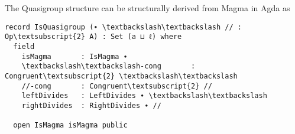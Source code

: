 The Quasigroup structure can be structurally derived from Magma in Agda as 

\begin{Verbatim}[commandchars=\\\{\},samepage=true]
record IsQuasigroup (∙ \textbackslash\textbackslash // : Op\textsubscript{2} A) : Set (a ⊔ ℓ) where
  field
    isMagma       : IsMagma ∙
    \textbackslash\textbackslash-cong       : Congruent\textsubscript{2} \textbackslash\textbackslash
    //-cong       : Congruent\textsubscript{2} //
    leftDivides   : LeftDivides ∙ \textbackslash\textbackslash
    rightDivides  : RightDivides ∙ //

  open IsMagma isMagma public
\end{Verbatim}
\begin{comment}
  \textbackslash\textbackslash-cong\textsuperscript{l} : LeftCongruent \textbackslash\textbackslash
  \textbackslash\textbackslash-cong\textsuperscript{l} y≈z = \textbackslash\textbackslash-cong refl y≈z

  \textbackslash\textbackslash-cong\textsuperscript{r} : RightCongruent \textbackslash\textbackslash
  \textbackslash\textbackslash-cong\textsuperscript{r} y≈z = \textbackslash\textbackslash-cong y≈z refl

  //-cong\textsuperscript{l} : LeftCongruent //
  //-cong\textsuperscript{l} y≈z = //-cong refl y≈z

  //-cong\textsuperscript{r} : RightCongruent //
  //-cong\textsuperscript{r} y≈z = //-cong y≈z refl

  leftDivides\textsuperscript{l} : LeftDivides\textsuperscript{l} ∙ \textbackslash\textbackslash
  leftDivides\textsuperscript{l} = proj\textsubscript{1} leftDivides

  leftDivides\textsuperscript{r} : LeftDivides\textsuperscript{r} ∙ \textbackslash\textbackslash
  leftDivides\textsuperscript{r} = proj\textsubscript{2} leftDivides

  rightDivides\textsuperscript{l} : RightDivides\textsuperscript{l} ∙ //
  rightDivides\textsuperscript{l} = proj\textsubscript{1} rightDivides

  rightDivides\textsuperscript{r} : RightDivides\textsuperscript{r} ∙ //
  rightDivides\textsuperscript{r} = proj\textsubscript{2} rightDivides
\end{comment}

